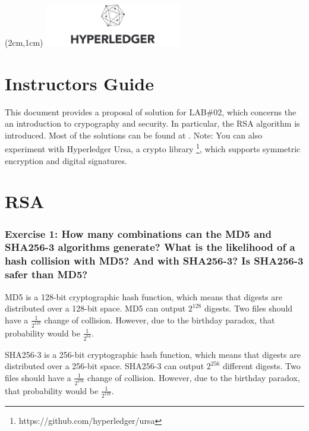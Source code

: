 \documentclass[12pt,a4paper]{article}
\begin{document}
\textblockorigin{-34pt}{-12pt}
\begin{textblock*}{10cm}(2cm,1cm)
\includegraphics[width=6cm]{hyperledger.png}
\end{textblock*}

\section*{Instructors Guide}
This document provides a proposal of solution for LAB\#02, which concerns the an introduction to crypography and security. In particular, the RSA algorithm is introduced. Most of the solutions can be found at \cite{conrad2016,rogaway2004,md2020}. Note: You can also experiment with Hyperledger Ursa, a crypto library \footnote{https://github.com/hyperledger/ursa}, which supports symmetric encryption and digital signatures. 





\section{RSA}
\label{sec:rsa}

\subsubsection*{Exercise 1: How many combinations can the MD5 and SHA256-3 algorithms generate? What is the likelihood of a hash collision with MD5? And with SHA256-3? Is SHA256-3 safer than MD5?}

MD5 is a 128-bit cryptographic hash function, which means that digests are distributed over a 128-bit space. MD5 can output $2^{128}$ digests. Two files should have a $\frac{1}{2^{128}}$ change of collision. However, due to the birthday paradox, that probability would be $\frac{1}{2^{64}}$.

SHA256-3 is a 256-bit cryptographic hash function, which means that digests are distributed over a 256-bit space. SHA256-3 can output $2^{256}$ different digests. 
Two files should have a $\frac{1}{2^{256}}$ change of collision. However, due to the birthday paradox, that probability would be $\frac{1}{2^{128}}$.
\end{document}
